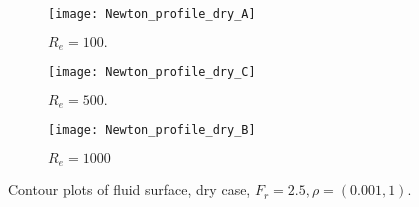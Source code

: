 \begin{figure}[H]
     \centering
     \begin{subfigure}[H]{0.31\textwidth} %
         \centering
         \texttt{[image: Newton\_profile\_dry\_A]} 
         \caption{$R_e=100.$}
         \label{fig:template-subfig-1}
     \end{subfigure}
     \hfill
     \begin{subfigure}[H]{0.31\textwidth} %
         \centering
         \texttt{[image: Newton\_profile\_dry\_C]}
         \caption{$R_e=500.$}
         \label{fig:dry_Re_500}
         \label{fig:template-subfig-2}
     \end{subfigure}
     \hfill
     \begin{subfigure}[H]{0.31\textwidth} %
         \centering
         \texttt{[image: Newton\_profile\_dry\_B]}
         \caption{$R_e=1000$}
         \label{fig:template-subfig-3}
     \end{subfigure}
        \caption[Template subfigure-description for list of figures.]{Contour plots of fluid surface, dry case, $F_r=2.5,\rho = (0.001,1)$.}
        \label{fig:template-subfig}
\end{figure}



